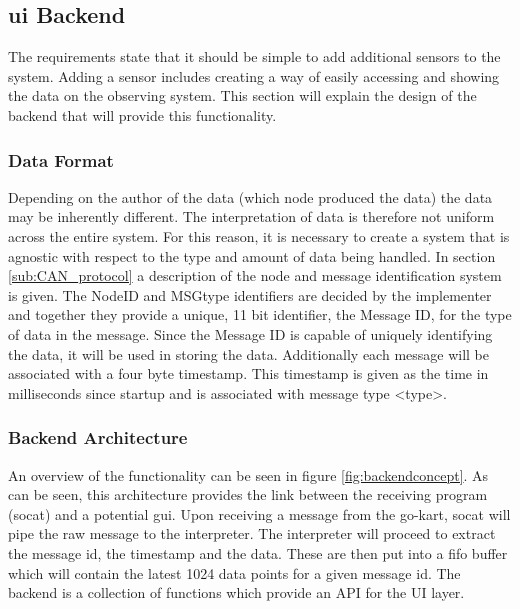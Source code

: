 \subsection{\acs{ui} Backend}
The requirements state that it should be simple to add additional sensors to the system.
Adding a sensor includes creating a way of easily accessing and showing the data on the observing system.
This section will explain the design of the backend that will provide this functionality.

\subsubsection*{Data Format}
Depending on the author of the data (which node produced the data) the data may be inherently different.
The interpretation of data is therefore not uniform across the entire system.
For this reason, it is necessary to create a system that is agnostic with respect to the type and amount of data being handled.
In section \ref{sub:CAN_protocol} a description of the node and message identification system is given.
The NodeID and MSGtype identifiers are decided by the implementer and together they provide a unique, 11 bit identifier, the Message ID, for the type of data in the message.
Since the Message ID is capable of uniquely identifying the data, it will be used in storing the data.
Additionally each message will be associated with a four byte timestamp.
This timestamp is given as the time in milliseconds since startup and is associated with message type <type>. 

\subsubsection*{Backend Architecture}
An overview of the functionality can be seen in figure \ref{fig:backendconcept}.
As can be seen, this architecture provides the link between the receiving program (socat) and a potential \acs{gui}.
Upon receiving a message from the go-kart, socat will pipe the raw message to the interpreter.
The interpreter will proceed to extract the message id, the timestamp and the data.
These are then put into a fifo buffer which will contain the latest 1024 data points for a given message id.
The backend is a collection of functions which provide an API for the UI layer. 

